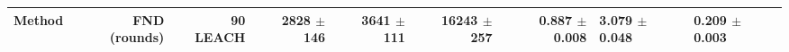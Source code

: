 \begin{tabular}{lrrrrrr}
\toprule
Method & FND (rounds) & 90 %
\midrule
LEACH & 2828 $\pm$ 146 & 3641 $\pm$ 111 & 16243 $\pm$ 257 & 0.887 $\pm$ 0.008 & 3.079 $\pm$ 0.048 & 0.209 $\pm$ 0.003 \\
\bottomrule
\end{tabular}